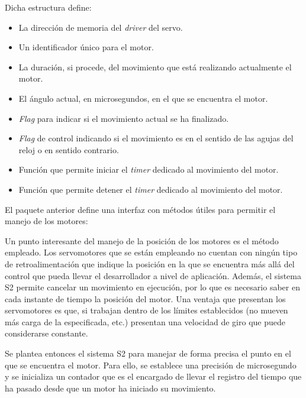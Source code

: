 

Dicha estructura define:

\begin{itemize}
    \item La dirección de memoria del \textit{driver} del servo.
    \item Un identificador único para el motor.
    \item La duración, si procede, del movimiento que está realizando actualmente el motor.
    \item El ángulo actual, en microsegundos, en el que se encuentra el motor.
    \item \textit{Flag} para indicar si el movimiento actual se ha finalizado.
    \item \textit{Flag} de control indicando si el movimiento es en el sentido de las agujas del reloj o en sentido contrario.
    \item Función que permite iniciar el \textit{timer} dedicado al movimiento del motor.
    \item Función que permite detener el \textit{timer} dedicado al movimiento del motor.
\end{itemize}

El paquete anterior define una interfaz con métodos útiles para permitir el manejo
de los motores:




Un punto interesante del manejo de la posición de los motores es el método empleado.
Los servomotores que se están empleando no cuentan con ningún tipo de retroalimentación
que indique la posición en la que se encuentra más allá del control que pueda llevar
el desarrollador a nivel de aplicación. Además, el sistema \ac{S2} permite cancelar un
movimiento en ejecución, por lo que es necesario saber en cada instante de tiempo la
posición del motor. Una ventaja que presentan los servomotores es que, si trabajan
dentro de los límites establecidos (no mueven más carga de la especificada, etc.)
presentan una velocidad de giro que puede considerarse constante.

Se plantea entonces el sistema \ac{S2} para manejar de forma precisa el punto
en el que se encuentra el motor. Para ello, se establece una precisión de microsegundo
y se inicializa un contador que es el encargado de llevar el registro del tiempo
que ha pasado desde que un motor ha iniciado su movimiento.


